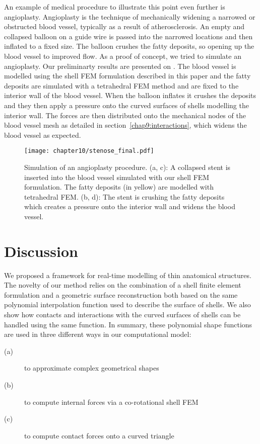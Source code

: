 An example of medical procedure to illustrate this point even further is angioplasty. Angioplasty is the technique of mechanically widening a narrowed or obstructed blood vessel, typically as a result of atherosclerosis. An empty and collapsed balloon on a guide wire is passed into the narrowed locations and then inflated to a fixed size. The balloon crushes the fatty deposits, so opening up the blood vessel to improved flow. As a proof of concept, we tried to simulate an angioplasty. Our preliminarty results are presented on . The blood vessel is modelled using the shell FEM formulation described in this paper and the fatty deposits are simulated with a tetrahedral FEM method and are fixed to the interior wall of the blood vessel. When the balloon inflates it crushes the deposits and they then apply a pressure onto the curved surfaces of shells modelling the interior wall. The forces are then distributed onto the mechanical nodes of the blood vessel mesh as detailed in section~\ref{chap9:interactions}, which widens the blood vessel as expected. 
%
\begin{figure}[ht]
\centering
\texttt{[image: chapter10/stenose\_final.pdf]}
\caption {Simulation of an angioplasty procedure. (a, c): A collapsed stent is inserted into the blood vessel simulated with our shell FEM formulation. The fatty deposits (in yellow) are modelled with tetrahedral FEM. (b, d): The stent is crushing the fatty deposits which creates a pressure onto the interior wall and widens the blood vessel.}
\label{chap10:fig-stent}
\end{figure}

\section{Discussion}

We proposed a framework for real-time modelling of thin anatomical structures. The novelty of our method relies on the combination of a shell finite element formulation and a geometric surface reconstruction both based on the same polynomial interpolation function used to describe the surface of shells. We also show how contacts and interactions with the curved surfaces of shells can be handled using the same function. In summary, these polynomial shape functions are used in three different ways in our computational model:
%
\begin{description}
\item[(a)] to approximate complex geometrical shapes
\item[(b)] to compute internal forces via a co-rotational shell FEM
\item[(c)] to compute contact forces onto a curved triangle
\end{description}

